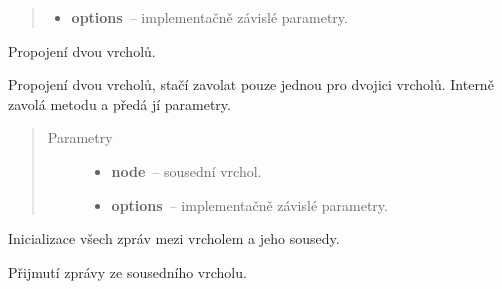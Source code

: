 \begin{fulllineitems}
\begin{fulllineitems}
\begin{quote}
\begin{description}
\begin{itemize}
\item {} 
\textbf{options}~-- implementačně závislé parametry.

\end{itemize}

\end{description}\end{quote}

\end{fulllineitems}


\begin{fulllineitems}
\label{alex.infer:alex.infer.factor.alex.infer.node.Node.connect}
Propojení dvou vrcholů.

Propojení dvou vrcholů, stačí zavolat pouze jednou pro dvojici vrcholů.
Interně zavolá metodu {\hyperref[alex.infer:alex.infer.factor.alex.infer.node.Node.add_neighbor]{}} a předá jí parametry.
\begin{quote}\begin{description}
\item[{Parametry}] \leavevmode\begin{itemize}
\item {} 
\textbf{node}~-- sousední vrchol.

\item {} 
\textbf{options}~-- implementačně závislé parametry.

\end{itemize}

\end{description}\end{quote}

\end{fulllineitems}


\begin{fulllineitems}
\label{alex.infer:alex.infer.factor.alex.infer.node.Node.init_messages}
Inicializace všech zpráv mezi vrcholem a jeho sousedy.

\end{fulllineitems}


\begin{fulllineitems}
\label{alex.infer:alex.infer.factor.alex.infer.node.Node.message_from}
Přijmutí zprávy ze sousedního vrcholu.


\end{fulllineitems}
\end{fulllineitems}
